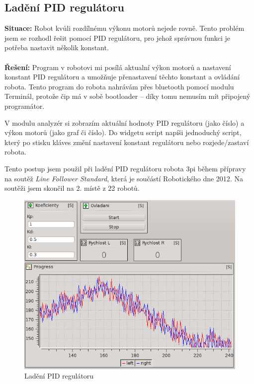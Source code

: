 \documentclass[12pt, a4paper, oneside]{article}
\newcommand{\It}{\textit}  %
\begin{document}
\newpage
\subsection{Ladění PID regulátoru}
{\bf Situace:} Robot kvůli rozdílnému výkonu motorů nejede rovně. Tento problém jsem se rozhodl řešit pomocí PID regulátoru, pro jehož správnou funkci je potřeba nastavit několik konstant. \\
\\
{\bf Řešení:} Program v robotovi mi posílá aktualní výkon motorů a nastavení konstant PID regulátoru a umožňuje přenastavení těchto konstant a ovládání robota. Tento program do robota nahrávám přes bluetooth pomocí modulu Terminál, protože čip má v sobě bootloader -- díky tomu nemusím mít připojený programátor.  

V modulu analyzér si zobrazím aktuální hodnoty PID regulátoru (jako číslo) a výkon motorů (jako graf či číslo). Do widgetu script napíši jednoduchý script, který po stisku kláves změní nastavení konstant regulátoru nebo rozjede/zastaví robota.

Tento postup jsem použil při ladění PID regulátoru robota 3pi\cite{3pi} během přípravy na soutěž \It{Line Follower Standard}, která je součástí Robotického dne 2012\cite{rob_den}. Na soutěži jsem skončil na 2. místě z 22 robotů\cite{robotday_res}.
\begin{figure}[H]
\begin{center}
\includegraphics[scale=0.55]{img/use_pid.png}
\caption{Ladění PID regulátoru}
\end{center}
\end{figure}
\end{document}
